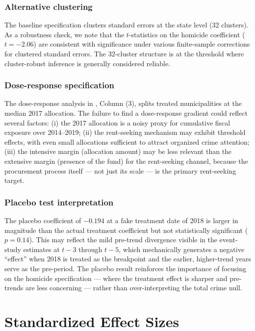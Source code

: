 \documentclass[12pt]{article}
\begin{document}
\subsubsection*{Alternative clustering} The baseline specification clusters standard errors at the state level (32 clusters). As a robustness check, we note that the $t$-statistics on the homicide coefficient ($t = -2.06$) are consistent with significance under various finite-sample corrections for clustered standard errors. The 32-cluster structure is at the threshold where cluster-robust inference is generally considered reliable.

\subsubsection*{Dose-response specification} The dose-response analysis in , Column (3), splits treated municipalities at the median 2017 allocation. The failure to find a dose-response gradient could reflect several factors: (i) the 2017 allocation is a noisy proxy for cumulative fiscal exposure over 2014--2019; (ii) the rent-seeking mechanism may exhibit threshold effects, with even small allocations sufficient to attract organized crime attention; (iii) the intensive margin (allocation amount) may be less relevant than the extensive margin (presence of the fund) for the rent-seeking channel, because the procurement process itself --- not just its scale --- is the primary rent-seeking target.

\subsubsection*{Placebo test interpretation} The placebo coefficient of $-0.194$ at a fake treatment date of 2018 is larger in magnitude than the actual treatment coefficient but not statistically significant ($p = 0.14$). This may reflect the mild pre-trend divergence visible in the event-study estimates at $t-3$ through $t-5$, which mechanically generates a negative ``effect'' when 2018 is treated as the breakpoint and the earlier, higher-trend years serve as the pre-period. The placebo result reinforces the importance of focusing on the homicide specification --- where the treatment effect is sharper and pre-trends are less concerning --- rather than over-interpreting the total crime null.


\section{Standardized Effect Sizes}
\label{sec:sde}


\end{document}
